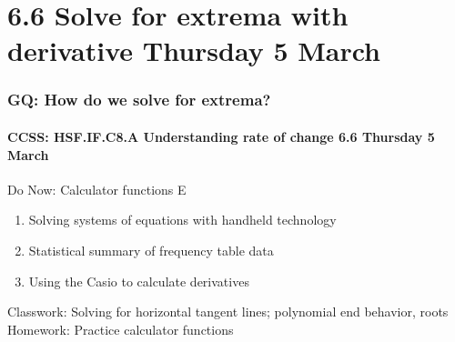 \documentclass{beamer}
\begin{document}
\section{6.6 Solve for extrema with derivative \hfill Thursday 5 March}
  \frame
  {
    \frametitle{GQ: How do we solve for extrema?}
    \framesubtitle{CCSS: HSF.IF.C8.A Understanding rate of change \hfill \alert{6.6 Thursday 5 March}}
    \begin{block}{Do Now: Calculator functions E}
      \begin{enumerate}
        \item Solving systems of equations with handheld technology
        \item Statistical summary of frequency table data
        \item Using the Casio to calculate derivatives
      \end{enumerate}
      \end{block}
      Classwork: Solving for horizontal tangent lines; polynomial end behavior, roots \\
      Homework: Practice calculator functions
      }
\end{document}
